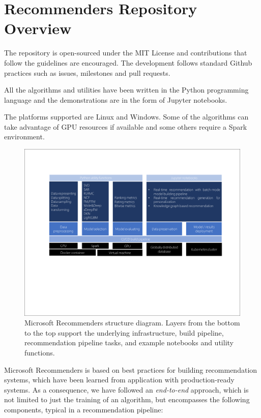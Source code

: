 \section{Recommenders Repository Overview}

The repository is open-sourced under the MIT License and contributions that follow the guidelines are encouraged.  
The development follows standard Github practices such as issues, milestones and pull requests.

All the algorithms and utilities have been written in the Python programming language and the demonstrations are 
in the form of Jupyter notebooks.

The platforms supported are Linux and Windows. Some of the algorithms can take advantage of GPU resources if available 
and some others require a Spark environment.

\begin{figure}
  \centering
  \includegraphics[width=\textwidth,keepaspectratio]{platform_diagram_crop.pdf}
  \caption{Microsoft Recommenders structure diagram. Layers from the bottom to the top support the underlying 
  infrastructure, build pipeline, recommendation pipeline tasks, and example notebooks and utility functions.}
\end{figure}

Microsoft Recommenders is based on best practices for building recommendation systems, which have been learned from 
application with production-ready systems. As a consequence, we have followed an {\em end-to-end} approach, which 
is not limited to just the training of an algorithm, but encompasses the following components, typical in a 
recommendation pipeline:

